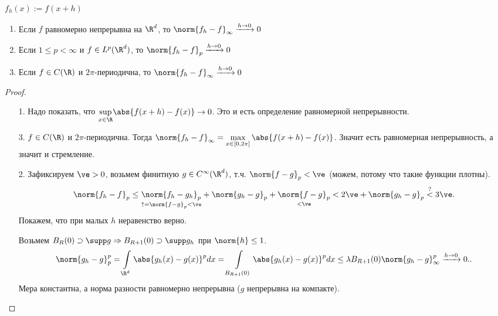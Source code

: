 \begin{theorem}
    $f_h(x) := f(x + h)$
    \begin{enumerate}
        \item Если $f$ равномерно непрерывна на $\R^d$, то $\norm{f_h - f}_\infty \xrightarrow{h \to 0} 0$
        \item Если $1 \leq p < \infty$ и $f \in L^p(\R^d)$, то $\norm{f_{h} - f}_{p} \xrightarrow{h \to 0} 0$
        \item Если $f \in C(\R)$ и $2\pi$-периодична, то $\norm{f_h - f}_\infty \xrightarrow{h \to 0} 0$
    \end{enumerate}
\end{theorem}
\begin{proof}$ $
    \begin{enumerate}
        \item[1.] Надо показать, что $\underset{x\in \R}{\sup} \abs{f(x + h) - f(x)} \to 0$. Это и есть определение равномерной непрерывности.
        \item[3.] $f \in C(\R)$ и $2\pi$-периодична.
              Тогда $\norm{f_h - f}_\infty = \max \limits_{x \in [0, 2\pi]} \abs{f(x + h) - f(x)}$.
              Значит есть равномерная непрерывность, а значит и стремление.
        \item[2.] Зафиксируем $\ve > 0$, возьмем финитную $g \in C^{\infty}(\R^d)$, т.ч. $\norm{f-g}_p < \ve$
              (можем, потому что такие функции плотны).
              \[
                  \norm{f_h - f}_p \leq \underset{\uparrow= \norm{f-g}_p < \ve}{\norm{f_h - g_h}_p}
                  + \norm{g_h - g}_p
                  + \underset{<\ve}{\norm{f - g}_p} <
                  2 \ve + \norm{g_h - g}_p \overset{?}{<} 3 \ve
                  .\]
              Покажем, что при малых $h$ неравенство верно.

              Возьмем $B_R(0) \supset \supp g \Rightarrow B_{R+1}(0) \supset \supp g_h$ при $\norm{h} \leq 1$.
              \[
                  \norm{g_h - g}_p^p = \int\limits_{\R^d} \abs{g_h(x) - g(x)}^p dx
                  = \int\limits_{B_{R+1}(0)} \abs{g_h(x) - g(x)}^p dx
                  \leq \lambda B_{R+1}(0) \norm{g_h - g}_\infty^p \xrightarrow{h \to 0} 0.
                  .\]
              Мера константна, а норма разности равномерно непрерывна ($g$ непрерывна на компакте).
    \end{enumerate}
\end{proof}
